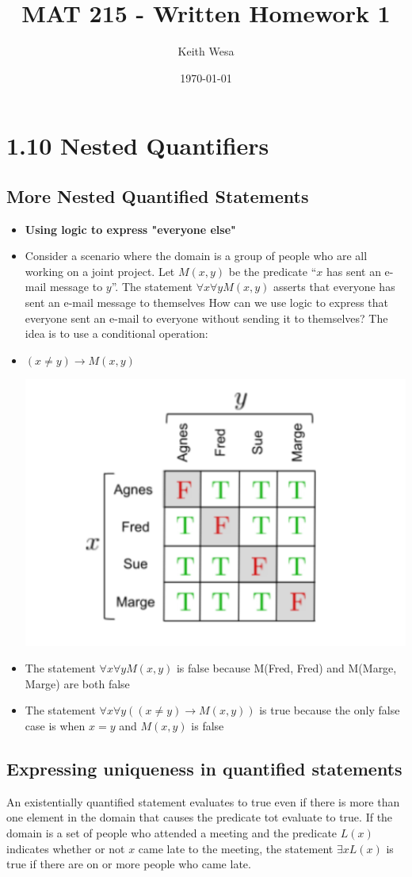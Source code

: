 \documentclass{article}
\author{Keith Wesa}
\title{MAT 215 - Written Homework 1}
\date{\today}
\begin{document}
\section*{1.10 Nested Quantifiers}
\subsection*{More Nested Quantified Statements}
\begin{itemize}
    \item[] \textbf{Using logic to express "everyone else"}
    \item Consider a scenario where the domain is a group of people who are all working on a joint project. Let $M(x,y)$ be the predicate
    ``$x$ has sent an e-mail message to $y$''. The statement $\forall x \forall y M(x,y)$ asserts that everyone has sent an e-mail message to themselves
    How can we use logic to express that everyone sent an e-mail to everyone without sending it to themselves? The idea is to use a conditional operation:
    \item[] $(x \neq y) \rightarrow M(x,y)$
    \begin{center}
        \includegraphics[scale=0.5]{1.10_TruthTable_1.png}
    \end{center}
    \item The statement $\forall x \forall y M(x,y)$ is false because M(Fred, Fred) and M(Marge, Marge) are both false
    \item The statement $\forall x \forall y ((x \neq y) \rightarrow M(x,y))$ is true because the only false case is when $x = y$ and $M(x,y)$ is false
\end{itemize}
\subsection*{Expressing uniqueness in quantified statements}
An existentially quantified statement evaluates to true even if there is more than one element in the domain that causes the predicate tot evaluate to true. 
If the domain is a set of people who attended a meeting and the predicate $L(x)$ indicates whether or not $x$ came late to the meeting, the statement $\exists x L(x)$
is true if there are on or more people who came late.
\end{document}
